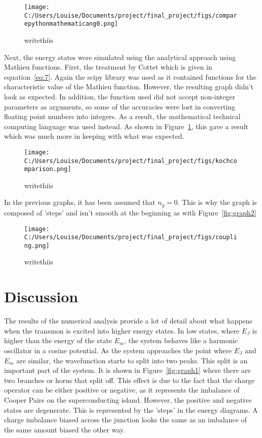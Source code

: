 \documentclass[11pt]{article}
\begin{document}
\begin{figure}[ht]
\centering
\texttt{[image: C:/Users/Louise/Documents/project/final\_project/figs/comparepythonmathematicang0.png]}
\caption{writethiis}
\label{fig:graph3}
\end{figure}
Next, the energy states were simulated using the analytical approach using Mathieu functions. First, the treatment by Cottet which is given in equation~\ref{eq:7}. Again the scipy library was used as it contained functions for the characteristic value of the Mathieu function. However, the resulting graph didn't look as expected. In addition, the function used did not accept non-integer parameters as arguments, so some of the accuracies were lost in converting floating point numbers into integers. As a result, the mathematical technical computing language was used instead. As shown in Figure~\ref{fig:graph3}, this gave a result which was much more in keeping with what was expected.
\begin{figure}[ht]
\centering
\texttt{[image: C:/Users/Louise/Documents/project/final\_project/figs/kochcomparison.png]}
\caption{writethiis}
\label{fig:graph4}
\end{figure}

In the previous graphs, it has been assumed that $n_g = 0$. This is why the graph is composed of 'steps' and isn't smooth at the beginning as with Figure~\ref{fig:graph2}

\begin{figure}[ht]
\centering
\texttt{[image: C:/Users/Louise/Documents/project/final\_project/figs/coupling.png]}
\caption{writethiis}
\label{fig:graph5}
\end{figure}

\section{Discussion}
The results of the numerical analysis provide a lot of detail about what happens when the transmon is excited into higher energy states. In low states, where $E_J$ is higher than the energy of the state $E_m$, the system behaves like a harmonic oscillator in a cosine potential. As the system approaches the point where $E_J$ and $E_m$ are similar, the wavefunction starts to split into two peaks. This split is an important part of the system. It is shown in Figure~\ref{fig:graph1} where there are two branches or horns that split off. This effect is due to the fact that the charge operator can be either positive or negative, as it represents the imbalance of Cooper Pairs on the superconducting island. However, the positive and negative states are degenerate. This is represented by the 'steps' in the energy diagrams. A charge imbalance biased across the junction looks the same as an imbalance of the same amount biased the other way.
\end{document}
